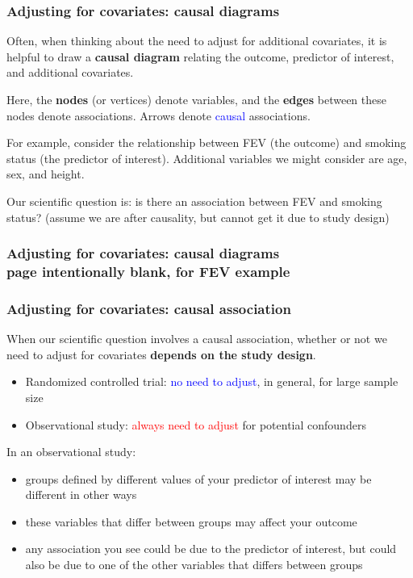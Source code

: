 \documentclass[12pt, 
hyperref={colorlinks=true, linkcolor=blue, urlcolor=cyan}]{beamer}
\begin{document}
\begin{frame}
\frametitle{Adjusting for covariates: causal diagrams}
Often, when thinking about the need to adjust for additional covariates, it is helpful to draw a \textbf{causal diagram} relating the outcome, predictor of interest, and additional covariates.

Here, the \textbf{nodes} (or vertices) denote variables, and the \textbf{edges} between these nodes denote associations. Arrows denote \textcolor{blue}{causal} associations.

For example, consider the relationship between FEV (the outcome) and smoking status (the predictor of interest). Additional variables we might consider are age, sex, and height. 

Our scientific question is: is there an association between FEV and smoking status? {\small (assume we are after causality, but cannot get it due to study design)}
\end{frame}

\begin{frame}
\frametitle{Adjusting for covariates: causal diagrams \\ {\small page intentionally blank, for FEV example}}


\end{frame}

\begin{frame}
\frametitle{Adjusting for covariates: causal association}

When our scientific question involves a causal association, whether or not we need to adjust for covariates \textbf{depends on the study design}. \vspace{-0.4cm}
\begin{itemize}
\item Randomized controlled trial: \textcolor{blue}{no need to adjust}, in general, for large sample size
\item Observational study: \textcolor{red}{always need to adjust} for potential confounders
\end{itemize}

In an observational study: \vspace{-0.4cm}
\begin{itemize}
\item groups defined by different values of your predictor of interest may be different in other ways
\item these variables that differ between groups may affect your outcome
\item any association you see could be due to the predictor of interest, but could also be due to one of the other variables that differs between groups
\end{itemize}
\end{frame}
\end{document}
